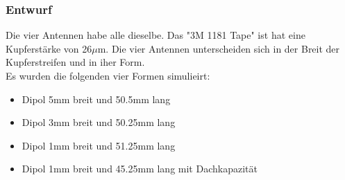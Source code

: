 \subsubsection*{Entwurf}
Die vier Antennen habe alle dieselbe. Das "3M 1181 Tape" ist  hat eine Kupferstärke von 26$\mu$m. Die vier Antennen unterscheiden sich in der Breit der Kupferstreifen und in iher Form.\\
Es wurden die folgenden vier Formen simulieirt:

\begin{itemize}
\item Dipol 5mm breit und 50.5mm lang
\item Dipol 3mm breit und 50.25mm lang
\item Dipol 1mm breit und 51.25mm lang
\item Dipol 1mm breit und 45.25mm lang mit Dachkapazität
\end{itemize}


